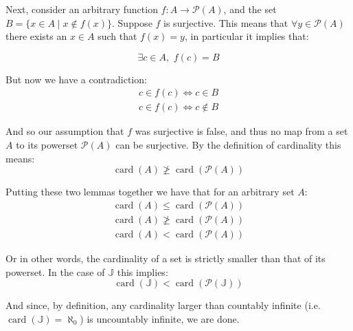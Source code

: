\documentclass{article}
\newcommand{\posint}{\mathbb J}
\newcommand{\pset}[1]{\mathcal P(#1)}
\newcommand{\card}[1]{\operatorname{card}(#1)}
\begin{document}
Next, consider an arbitrary function $f:A\to\pset A$, and the set $B=\{x\in A\mid x\not\in f(x)\}$. Suppose $f$ is surjective. This means that $\forall y\in \pset A$ there exists an $x\in A$ such that $f(x)=y$, in particular it implies that:

\begin{equation}
    \exists c\in A,\,\,f(c)=B\tag{$f$ is surjective \& $B\in\pset A$}
\end{equation}
\medskip

But now we have a contradiction:
\begin{align*}
    c\in f(c)\iff c\in B\tag{$f(c)=B$ \& def. of set equality}\\
    c\in f(c)\iff c\not\in B\tag{def. of B}
\end{align*}

And so our assumption that $f$ was surjective is false, and thus no map from a set $A$ to its powerset $\pset A$ can be surjective. By the definition of cardinality this means:
\begin{equation}
    \card A\not\ge\card{\pset A}\tag{Lemma 2}
\end{equation}
\medskip

Putting these two lemmas together we have that for an arbitrary set $A$:
\begin{align*}
    \card A\le\card{\pset A}\tag{Lemma 1}\\
    \card A\not\ge\card{\pset A}\tag{Lemma 2}\\
    \hline
    \card A<\card{\pset A}\tag{Cantor's Theorem}
\end{align*}

Or in other words, the cardinality of a set is strictly smaller than that of its powerset. In the case of $\posint$ this implies:
$$\card\posint<\card{\pset\posint}$$

And since, by definition, any cardinality larger than countably infinite (i.e. $\card\posint=\aleph_0$) is uncountably infinite, we are done.
\end{document}
